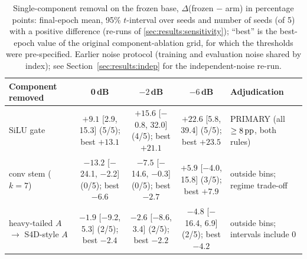 \begin{table}[htbp]
\centering
\caption{Single-component removal on the frozen base, $\Delta$(frozen $-$ arm) in percentage points: final-epoch mean, 95\% $t$-interval over seeds and number of seeds (of 5) with a positive difference (re-runs of \ref{sec:results:sensitivity}); ``best'' is the best-epoch value of the original component-ablation grid, for which the thresholds were pre-specified. Earlier noise protocol (training and evaluation noise shared by index); see Section~\ref{sec:results:indep} for the independent-noise re-run.}
\label{tab:localise}
\scriptsize\setlength{\tabcolsep}{4pt}
\begin{tabular}{@{}lcccp{2.6cm}@{}}
\toprule
Component removed & 0\,dB & $-2$\,dB & $-6$\,dB & Adjudication \\
\midrule
SiLU gate & \shortstack{$+9.1$\\ {[}2.9, 15.3{]}\\ (5/5); best $+13.1$} & \shortstack{$+15.6$\\ {[}$-$0.8, 32.0{]}\\ (4/5); best $+21.1$} & \shortstack{$+22.6$\\ {[}5.8, 39.4{]}\\ (5/5); best $+23.5$} & PRIMARY (all $\geq 8\,\mathrm{pp}$, both rules) \\[3pt]
\shortstack[l]{conv stem\\ ($k{=}7$)} & \shortstack{$-13.2$\\ {[}$-$24.1, $-$2.2{]}\\ (0/5); best $-6.6$} & \shortstack{$-7.5$\\ {[}$-$14.6, $-$0.3{]}\\ (0/5); best $-2.7$} & \shortstack{$+5.9$\\ {[}$-$4.0, 15.8{]}\\ (3/5); best $+7.9$} & outside bins; regime trade-off \\[3pt]
\shortstack[l]{heavy-tailed $A$\\ $\rightarrow$ S4D-style $A$} & \shortstack{$-1.9$\\ {[}$-$9.2, 5.3{]}\\ (2/5); best $-2.4$} & \shortstack{$-2.6$\\ {[}$-$8.6, 3.4{]}\\ (2/5); best $-2.2$} & \shortstack{$-4.8$\\ {[}$-$16.4, 6.9{]}\\ (2/5); best $-4.2$} & outside bins; intervals include 0 \\[3pt]
\bottomrule
\end{tabular}
\end{table}

